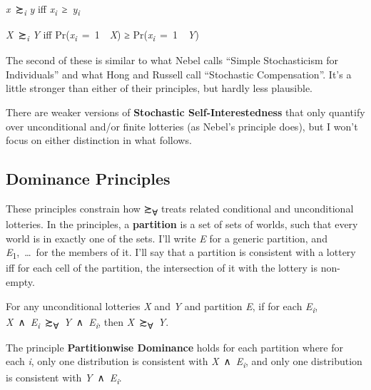 \documentclass[
  11pt,
  letterpaper,
  DIV=11,
  numbers=noendperiod,
  twoside]{scrartcl}
\providecommand{\tightlist}{%
  \setlength{\itemsep}{0pt}\setlength{\parskip}{0pt}}
\begin{document}
\begin{description}
\tightlist
\item[Self-Interestedness]
\emph{x}~≿\textsubscript{\emph{i}} \emph{y} iff
\emph{x\textsubscript{i}}~≥~\emph{y\textsubscript{i}}
\item[Stochastic Self-Interestedness]
\emph{X}~≿\textsubscript{\emph{i}} \emph{Y} iff
Pr(\emph{x\textsubscript{i}}~=~1~\textbar~\emph{X}) ≥
Pr(\emph{x\textsubscript{i}}~=~1~\textbar~\emph{Y})
\end{description}

The second of these is similar to what Nebel calls ``Simple
Stochasticism for Individuals'' and what Hong and Russell call
``Stochastic Compensation''. It's a little stronger than either of their
principles, but hardly less plausible.

There are weaker versions of \textbf{Stochastic Self-Interestedness}
that only quantify over unconditional and/or finite lotteries (as
Nebel's principle does), but I won't focus on either distinction in what
follows.

\subsection{Dominance Principles}\label{dominance-principles}

These principles constrain how ≿\textsubscript{∀} treats related
conditional and unconditional lotteries. In the principles, a
\textbf{partition} is a set of sets of worlds, such that every world is
in exactly one of the sets. I'll write \emph{E} for a generic partition,
and \emph{E}\textsubscript{1},~\ldots~for the members of it. I'll say
that a partition is consistent with a lottery iff for each cell of the
partition, the intersection of it with the lottery is non-empty.

\begin{description}
\tightlist
\item[Partitionwise Dominance]
For any unconditional lotteries \emph{X} and \emph{Y} and partition
\emph{E}, if for each \emph{E\textsubscript{i}},
\emph{X}~∧~\emph{E\textsubscript{i}}~≿\textsubscript{∀}~\emph{Y}~∧~\emph{E\textsubscript{i}},
then \emph{X}~≿\textsubscript{∀}~\emph{Y}.
\item[Statewise Dominance]
The principle \textbf{Partitionwise Dominance} holds for each partition
where for each \emph{i}, only one distribution is consistent with
\emph{X}~∧~\emph{E\textsubscript{i}}, and only one distribution is
consistent with \emph{Y}~∧~\emph{E\textsubscript{i}}.
\end{description}
\end{document}
